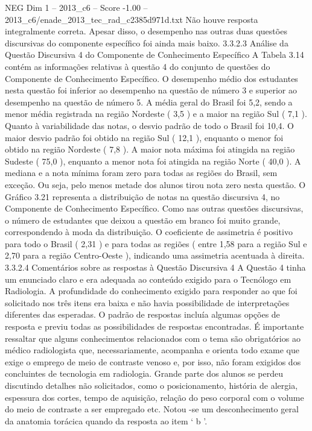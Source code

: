 \begin{textsample}{NEG Dim 1 – 2013\_c6 – Score -1.00 – 2013\_c6/enade\_2013\_tec\_rad\_c2385d971d.txt}
Não houve resposta integralmente correta.
Apesar disso, o desempenho nas outras duas questões discursivas do componente específico foi ainda mais baixo. 3.3.2.3 Análise da Questão Discursiva 4 do Componente de Conhecimento Específico A Tabela 3.14 contém as informações relativas à questão 4 do conjunto de questões do Componente de Conhecimento Específico.
O desempenho médio dos estudantes nesta questão foi inferior ao desempenho na questão de número 3 e superior ao desempenho na questão de número 5.
A média geral do Brasil foi 5,2, sendo a menor média registrada na região Nordeste ( 3,5 ) e a maior na região Sul ( 7,1 ).
Quanto à variabilidade das notas, o desvio padrão de todo o Brasil foi 10,4.
O maior desvio padrão foi obtido na região Sul ( 12,1 ), enquanto o menor foi obtido na região Nordeste ( 7,8 ).
A maior nota máxima foi atingida na região Sudeste ( 75,0 ), enquanto a menor nota foi atingida na região Norte ( 40,0 ).
A mediana e a nota mínima foram zero para todas as regiões do Brasil, sem exceção.
Ou seja, pelo menos metade dos alunos tirou nota zero nesta questão.
O Gráfico 3.21 representa a distribuição de notas na questão discursiva 4, no Componente de Conhecimento Específico.
Como nas outras questões discursivas, o número de estudantes que deixou a questão em branco foi muito grande, correspondendo à moda da distribuição.
O coeficiente de assimetria é positivo para todo o Brasil ( 2,31 ) e para todas as regiões ( entre 1,58 para a região Sul e 2,70 para a região Centro-Oeste ), indicando uma assimetria acentuada à direita. 3.3.2.4 Comentários sobre as respostas à Questão Discursiva 4 A Questão 4 tinha um enunciado claro e era adequada ao conteúdo exigido para o Tecnólogo em Radiologia.
A profundidade do conhecimento exigido para responder ao que foi solicitado nos três itens era baixa e não havia possibilidade de interpretações diferentes das esperadas.
O padrão de respostas incluía algumas opções de resposta e previu todas as possibilidades de respostas encontradas.
É importante ressaltar que alguns conhecimentos relacionados com o tema são obrigatórios ao médico radiologista que, necessariamente, acompanha e orienta todo exame que exige o emprego de meio de contraste venoso e, por isso, não foram exigidos dos concluintes de tecnologia em radiologia.
Grande parte dos alunos se perdeu discutindo detalhes não solicitados, como o posicionamento, história de alergia, espessura dos cortes, tempo de aquisição, relação do peso corporal com o volume do meio de contraste a ser empregado etc.
Notou -se um desconhecimento geral da anatomia torácica quando da resposta ao item ‘ b ’.

\end{textsample}
